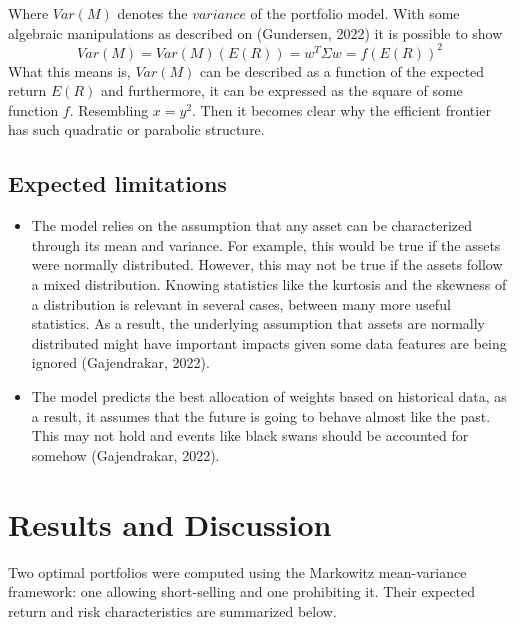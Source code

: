 \documentclass[11pt]{article}
\begin{document}
Where $Var(M)$ denotes the $variance$ of the portfolio model. With some algebraic manipulations as described on (Gundersen, 2022) it is possible to show
\begin{equation}
    Var(M) = Var(M) (E(R)) = w^T \Sigma w = f(E(R))^2 
\end{equation}
What this means is, $Var(M)$ can be described as a function of the expected return $E(R)$ and furthermore, it can be expressed as the square of some function $f$. Resembling $x=y^2$. Then it becomes clear why the efficient frontier has such quadratic or parabolic structure.

\subsection*{Expected limitations}
\begin{itemize}
    \item The model relies on the assumption that any asset can be characterized through its mean and variance. For example, this would be true if the assets were normally distributed. However, this may not be true if the assets follow a mixed distribution. Knowing statistics like the kurtosis and the skewness of a distribution is relevant in several cases, between many more useful statistics. As a result, the underlying assumption that assets are normally distributed might have important impacts given some data features are being ignored (Gajendrakar, 2022).
    
    \item The model predicts the best allocation of weights based on historical data, as a result, it assumes that the future is going to behave almost like the past. This may not hold and events like black swans should be accounted for somehow (Gajendrakar, 2022).
    
\end{itemize}




\section{Results and Discussion}
Two optimal portfolios were computed using the Markowitz mean-variance framework: one allowing short-selling and one prohibiting it. Their expected return and risk characteristics are summarized below.
\end{document}
